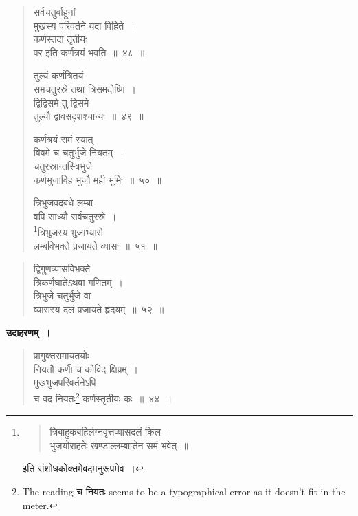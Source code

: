 \documentclass[11pt, openany]{book}
\begin{document}
 \label{4.51}
\begin{quote}
\bs
 सर्वचतुर्बाहूनां \\
 मुखस्य परिवर्तने यदा विहिते~।\\
कर्णस्तदा तृतीयः \\
पर इति कर्णत्रयं भवति~॥~४८~॥
\vspace{1mm}

तुल्यं कर्णत्रितयं \\
समचतुरस्रे तथा त्रिसमदोष्णि~।\\
द्विद्विसमे तु द्विसमे \\
तुल्यौ द्वावसदृशश्चान्यः~॥~४९~॥ 
\vspace{1mm}

कर्णत्रयं समं स्यात् \\
विषमे च चतुर्भुजे नियतम्~।\\
चतुरस्रान्तस्त्रिभुजे \\
कर्णभुजाविह भुजौ मही भूमिः~॥~५०~॥
\vspace{1mm}

त्रिभुजवदबधे लम्बा-\\
वपि साध्यौ सर्वचतुरस्रे~। \\
 \footnote{\vspace{-4mm} \begin{quote}
{\color{violet}त्रिबाहुकबहिर्लग्नवृत्तव्यासदलं किल~। \\
 भुजयोराहतेः खण्डाल्लम्बाप्तेन समं भवेत्~॥ }
 \end{quote}
 
\hspace{3cm} इति संशोधकोक्तमेवदमनुरूपमेव~।}त्रिभुजस्य भुजाभ्यासे \\
लम्बविभक्ते प्रजायते व्यासः~॥~५१~॥
\end{quote}
\newpage%

 \label{4.52}
\begin{quote}
    \bs 
     द्विगुणव्यासविभक्ते \\
     त्रिकर्णघातेऽथवा गणितम्~।\\
त्रिभुजे चतुर्भुजे वा \\
व्यासस्य दलं प्रजायते हृदयम्~॥~५२~॥
\end{quote}

 \textbf{उदाहरणम्~।} 
\begin{quote}
    \bqt 
     प्रागुक्तसमायतयोः \\
     नियतौ कर्णाै च कोविद क्षिप्रम्~।\\
मुखभुजपरिवर्तनेऽपि \\
च वद नियतः\footnote{The reading च नियतः seems to be a typographical error as it doesn't fit in the meter.} कर्णस्तृतीयः कः~॥~४४~॥
\end{quote}
\end{document}
